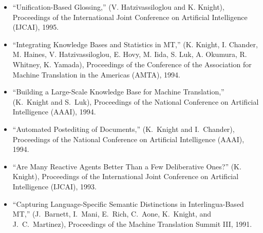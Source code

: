 \begin{itemize}
\item ``Unification-Based Glossing,''
(V. Hatzivassiloglou and K. Knight), Proceedings of the International Joint Conference on Artificial Intelligence (IJCAI), 1995.

\item ``Integrating Knowledge Bases and Statistics in MT,''
(K. Knight, I. Chander, M. Haines, V. Hatzivassiloglou,  E. Hovy,
M. Iida, S. Luk, A. Okumura, R. Whitney, K. Yamada),
Proceedings of the Conference of the Association for Machine Translation 
in the Americas (AMTA), 1994.

\item ``Building a Large-Scale Knowledge Base for Machine Translation,''
(K.~Knight and S.~Luk), 
Proceedings of the National Conference on Artificial Intelligence (AAAI), 1994.

\item ``Automated Postediting of Documents,''
(K.~Knight and I.~Chander),
Proceedings of the National Conference on Artificial Intelligence (AAAI), 1994.

\item ``Are Many Reactive Agents Better Than a Few Deliberative Ones?''
(K. Knight),
Proceedings of the International Joint Conference on Artificial Intelligence (IJCAI), 1993.


\item ``Capturing Language-Specific Semantic Distinctions
in Interlingua-Based MT,'' (J.~Barnett, I.~Mani, E.~Rich, C.~Aone,
K.~Knight, and J.~C.~Martinez), Proceedings of the Machine Translation 
Summit III, 1991.


\end{itemize}

